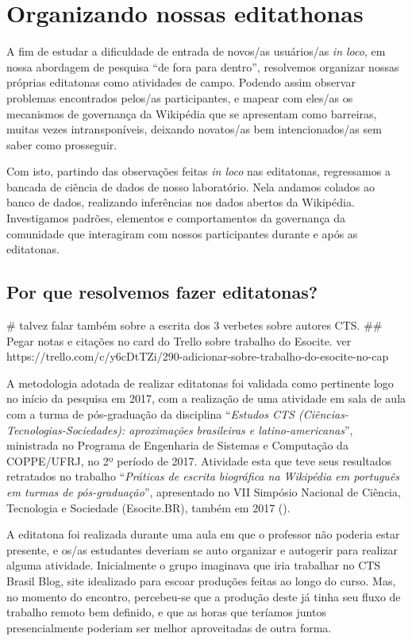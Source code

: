 \section{Organizando nossas editathonas}

A fim de estudar a dificuldade de entrada de novos/as usuários/as \textit{in loco}, em nossa abordagem de pesquisa ``de fora para dentro'', resolvemos organizar nossas próprias editatonas como atividades de campo. Podendo assim observar problemas encontrados pelos/as participantes, e mapear com eles/as os mecanismos de governança da Wikipédia que se apresentam como barreiras, muitas vezes intransponíveis, deixando novatos/as bem intencionados/as sem saber como prosseguir.

Com isto, partindo das observações feitas \textit{in loco} nas editatonas, regressamos a bancada de ciência de dados de nosso laboratório. Nela andamos colados ao banco de dados, realizando inferências nos dados abertos da Wikipédia. Investigamos padrões, elementos e comportamentos da governança da comunidade que interagiram com nossos participantes durante e após as editatonas.

\subsection{Por que resolvemos fazer editatonas?}

# talvez falar também sobre a escrita dos 3 verbetes sobre autores CTS. ## Pegar notas e citações no card do Trello sobre trabalho do Esocite. ver https://trello.com/c/y6cDtTZi/290-adicionar-sobre-trabalho-do-esocite-no-cap%

A metodologia adotada de realizar editatonas foi validada como pertinente logo no início da pesquisa em 2017, com a realização de uma atividade em sala de aula com a turma de pós-graduação da disciplina ``\textit{Estudos CTS (Ciências-Tecnologias-Sociedades): aproximações brasileiras e latino-americanas}'', ministrada no Programa de Engenharia de Sistemas e Computação da COPPE/UFRJ, no 2º período de 2017. Atividade esta que teve seus resultados retratados no trabalho ``\textit{Práticas de escrita biográfica na Wikipédia em português em turmas de pós-graduação}'', apresentado no VII Simpósio Nacional de Ciência, Tecnologia e Sociedade (Esocite.BR), também em 2017 (\cite{andrade_historias_2017}).

A editatona foi realizada durante uma aula em que o professor não poderia estar presente, e os/as estudantes deveriam se auto organizar e autogerir para realizar alguma atividade. Inicialmente o grupo imaginava que iria trabalhar no CTS Brasil Blog, site idealizado para escoar produções feitas ao longo do curso. Mas, no momento do encontro, percebeu-se que a produção deste já tinha seu fluxo de trabalho remoto bem definido, e que as horas que teríamos juntos presencialmente poderiam ser melhor aproveitadas de outra forma.

